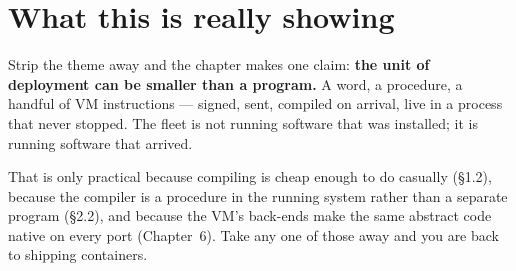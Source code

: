 \section{What this is really showing}

Strip the theme away and the chapter makes one claim: \textbf{the unit of
deployment can be smaller than a program.} A word, a procedure, a handful of
VM instructions --- signed, sent, compiled on arrival, live in a process that
never stopped. The fleet is not running software that was installed; it is
running software that arrived.

That is only practical because compiling is cheap enough to do casually
(\S1.2), because the compiler is a procedure in the running system rather
than a separate program (\S2.2), and because the VM's back-ends make the same
abstract code native on every port (Chapter~6). Take any one of those away
and you are back to shipping containers.
